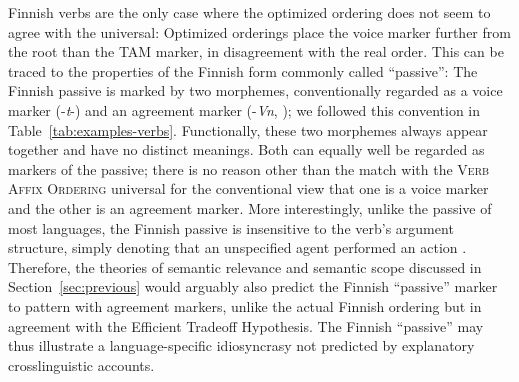 \documentclass[man]{apa7}
\newcommand{\citep}{\parencite}
\newcommand{\citet}{\Textcite}
\newcommand\mhahn[1]{{\color{red}(#1)}}
\begin{document}
Finnish verbs are the only case where the optimized ordering does not seem to agree with the universal: Optimized orderings place the voice marker further from the root than the TAM marker, in disagreement with the real order.
This can be traced to the properties of the Finnish form commonly called ``passive'':
The Finnish passive is marked by two morphemes, conventionally regarded as a voice marker (-\textit{t}-) and an agreement marker (-\textit{Vn}, \citet[Section 69]{karlsson1999finnish}); we followed this convention in Table~\ref{tab:examples-verbs}.
Functionally, these two morphemes always appear together and have no distinct meanings.
Both can equally well be regarded as markers of the passive; there is no reason other than the match with the \textsc{Verb Affix Ordering} universal for the conventional view that one is a voice marker and the other is an agreement marker.
More interestingly, unlike the passive of most languages, the Finnish passive is insensitive to the verb's argument structure, simply denoting that an unspecified agent performed an action \citep{Shore1988OnTS,Blevins2003PassivesAI}.
Therefore, the theories of semantic relevance and semantic scope discussed in Section~\ref{sec:previous} would arguably also predict the Finnish ``passive'' marker to pattern with agreement markers, unlike the actual Finnish ordering but in agreement with the Efficient Tradeoff Hypothesis.
The Finnish ``passive'' may thus illustrate a language-specific idiosyncrasy not predicted by explanatory crosslinguistic accounts.






\end{document}
